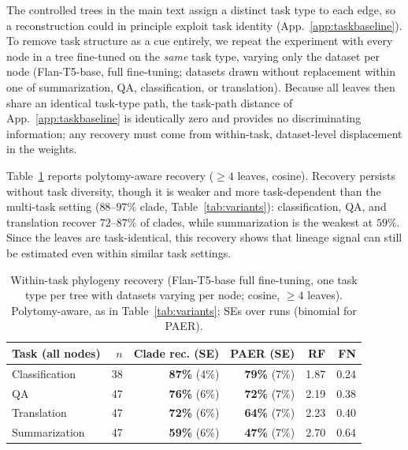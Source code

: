 \documentclass{article}
\theoremstyle{definition}
\theoremstyle{plain}
\begin{document}
The controlled trees in the main text assign a distinct task type to each edge, so a reconstruction
could in principle exploit task identity (App.~\ref{app:taskbaseline}). To remove task structure as a
cue entirely, we repeat the experiment with every node in a tree fine-tuned on the \emph{same} task
type, varying only the dataset per node (Flan-T5-base, full fine-tuning; datasets drawn without
replacement within one of summarization, QA, classification, or translation). Because all leaves then
share an identical task-type path, the task-path distance of App.~\ref{app:taskbaseline} is identically
zero and provides no discriminating information; any recovery must come from within-task,
dataset-level displacement in the weights.

Table~\ref{tab:withintask} reports polytomy-aware recovery ($\geq 4$ leaves, cosine). Recovery persists
without task diversity, though it is weaker and more task-dependent than the multi-task setting
($88$--$97\%$ clade, Table~\ref{tab:variants}): classification, QA, and translation recover $72$--$87\%$
of clades, while summarization is the weakest at $59\%$.
Since the leaves are task-identical, this recovery shows that lineage signal can still be estimated even within similar task settings.

\begin{table}[h]
\caption{Within-task phylogeny recovery (Flan-T5-base full fine-tuning, one task type per tree with
  datasets varying per node; cosine, $\geq 4$ leaves). Polytomy-aware, as in
  Table~\ref{tab:variants}; SEs over runs (binomial for PAER).}
\label{tab:withintask}
\centering
\small
\begin{tabular}{lrrrrr}
\toprule
Task (all nodes) & $n$ & Clade rec. (SE) & PAER (SE) & RF & FN \\
\midrule
Classification & 38 & \textbf{87\%} (4\%) & \textbf{79\%} (7\%) & 1.87 & 0.24 \\
QA             & 47 & \textbf{76\%} (6\%) & \textbf{72\%} (7\%) & 2.19 & 0.38 \\
Translation    & 47 & \textbf{72\%} (6\%) & \textbf{64\%} (7\%) & 2.23 & 0.40 \\
Summarization  & 47 & \textbf{59\%} (6\%) & \textbf{47\%} (7\%) & 2.70 & 0.64 \\
\bottomrule
\end{tabular}
\end{table}
\end{document}
